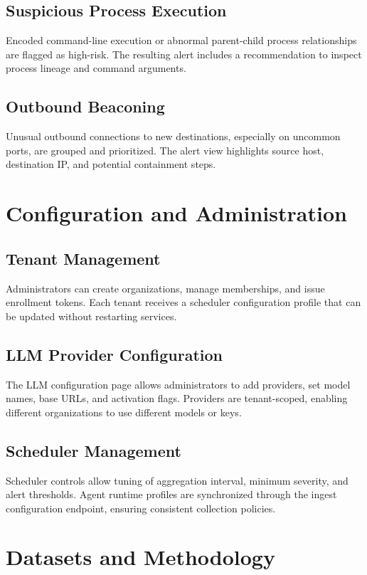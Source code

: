 \documentclass[conference]{IEEEtran}
\begin{document}
\subsection{Suspicious Process Execution}
Encoded command-line execution or abnormal parent-child process relationships are flagged as high-risk. The resulting alert includes a recommendation to inspect process lineage and command arguments.

\subsection{Outbound Beaconing}
Unusual outbound connections to new destinations, especially on uncommon ports, are grouped and prioritized. The alert view highlights source host, destination IP, and potential containment steps.

\section{Configuration and Administration}
\subsection{Tenant Management}
Administrators can create organizations, manage memberships, and issue enrollment tokens. Each tenant receives a scheduler configuration profile that can be updated without restarting services.

\subsection{LLM Provider Configuration}
The LLM configuration page allows administrators to add providers, set model names, base URLs, and activation flags. Providers are tenant-scoped, enabling different organizations to use different models or keys.

\subsection{Scheduler Management}
Scheduler controls allow tuning of aggregation interval, minimum severity, and alert thresholds. Agent runtime profiles are synchronized through the ingest configuration endpoint, ensuring consistent collection policies.

\section{Datasets and Methodology}
\end{document}
